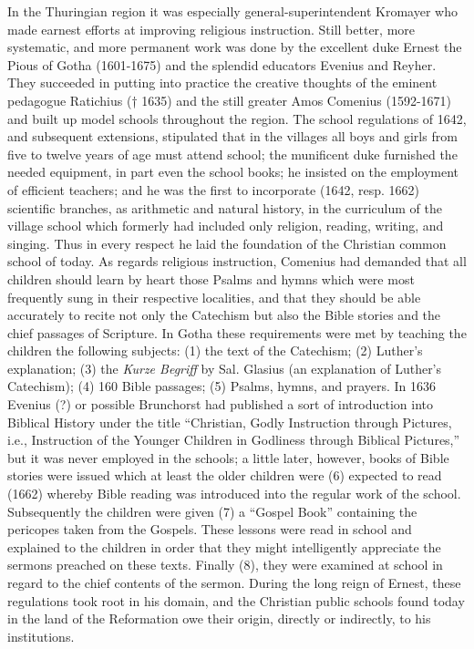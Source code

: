In the Thuringian region it was especially general-super\-intendent Kromayer who made earnest efforts at improving religious instruction. Still better, more systematic, and more permanent work was done by the excellent duke Ernest the Pious of Gotha (1601-1675) and the splendid educators Evenius and Reyher. They succeeded in putting into practice the creative thoughts of the eminent pedagogue Ratichius († 1635) and the still greater Amos Comenius (1592-1671) and built up model schools throughout the region. The school regulations of 1642, and subsequent extensions, stipulated that in the villages all boys and girls from five to twelve years of age must attend school; the munificent duke furnished the needed equipment, in part even the school books; he insisted on the employment of efficient teachers; and he was the first to incorporate (1642, resp. 1662) scientific branches, as arithmetic and natural history, in the curriculum of the village school which formerly had included only religion, reading, writing, and singing. Thus in every respect he laid the foundation of the Christian common school of today. As regards religious instruction, Comenius had demanded that all children should learn by heart those Psalms and hymns which were most frequently sung in their respective localities, and that they should be able accurately to recite not only the Catechism but also the Bible stories and the chief passages of Scripture. In Gotha these requirements were met by teaching the children the following subjects: (1) the text of the Catechism; (2) Luther’s explanation; (3) the \emph{Kurze Begriff} by Sal. Glasius (an explanation of Luther’s Catechism); (4) 160 Bible passages; (5) Psalms, hymns, and prayers. In 1636 Evenius (?) or possible Brunchorst had published a sort of introduction into Biblical History under the title “Christian, Godly Instruction through
Pictures, i.e., Instruction of the Younger Children in Godliness through Biblical Pictures,” but it was never employed in the schools; a little later, however, books of Bible stories were issued which at least the older children were (6) expected to read (1662) whereby Bible reading was introduced into the regular work of the school. Subsequently the children were given (7) a “Gospel Book” containing the pericopes taken from the Gospels. These lessons were read in school and explained to the children in order that they might intelligently appreciate the sermons preached on these texts. Finally (8), they were examined at school in regard to the chief contents of the sermon. During the long reign of Ernest, these regulations took root in his domain, and the Christian public schools found today in the land of the Reformation owe their origin, directly or indirectly, to his institutions.

